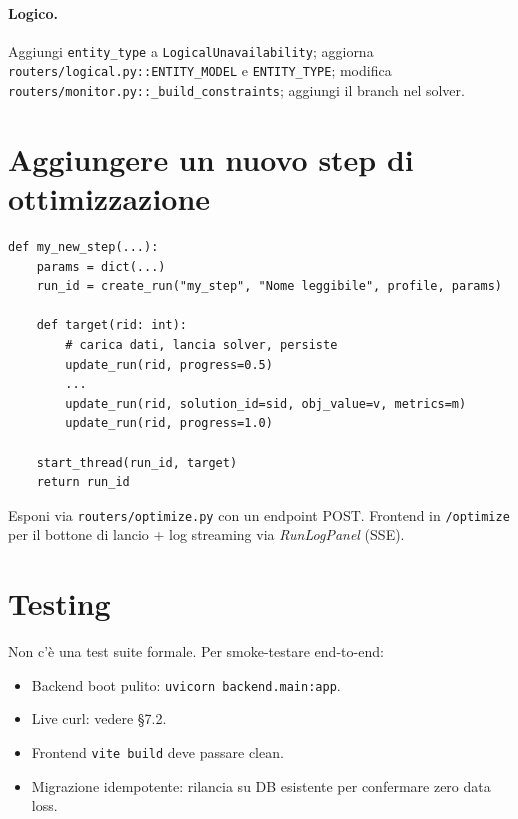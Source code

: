\paragraph{Logico.} Aggiungi \texttt{entity\_type} a
\texttt{LogicalUnavailability}; aggiorna
\texttt{routers/logical.py::ENTITY\_MODEL} e \texttt{ENTITY\_TYPE};
modifica \texttt{routers/monitor.py::\_build\_constraints}; aggiungi
il branch nel solver.

\section{Aggiungere un nuovo step di ottimizzazione}

\begin{lstlisting}[style=py]
def my_new_step(...):
    params = dict(...)
    run_id = create_run("my_step", "Nome leggibile", profile, params)

    def target(rid: int):
        # carica dati, lancia solver, persiste
        update_run(rid, progress=0.5)
        ...
        update_run(rid, solution_id=sid, obj_value=v, metrics=m)
        update_run(rid, progress=1.0)

    start_thread(run_id, target)
    return run_id
\end{lstlisting}

Esponi via \texttt{routers/optimize.py} con un endpoint POST.
Frontend in \texttt{/optimize} per il bottone di lancio + log
streaming via \emph{RunLogPanel} (SSE).

\section{Testing}

Non c'\`e una test suite formale. Per smoke-testare end-to-end:

\begin{itemize}
  \item Backend boot pulito: \texttt{uvicorn backend.main:app}.
  \item Live curl: vedere \S7.2.
  \item Frontend \texttt{vite build} deve passare clean.
  \item Migrazione idempotente: rilancia su DB esistente per
        confermare zero data loss.
\end{itemize}

\appendix

